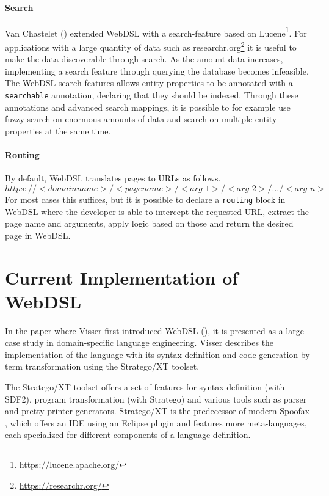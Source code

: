     \paragraph{Search} Van Chastelet (\citeyear{VanChastelet2013}) extended WebDSL with a search-feature based on Lucene\footnote{\url{https://lucene.apache.org/}}. For applications with a large quantity of data such as researchr.org\footnote{\url{https://researchr.org/}} it is useful to make the data discoverable through search. As the amount data increases, implementing a search feature through querying the database becomes infeasible. The WebDSL search features allows entity properties to be annotated with a \texttt{searchable} annotation, declaring that they should be indexed. Through these annotations and advanced search mappings, it is possible to for example use fuzzy search on enormous amounts of data and search on multiple entity properties at the same time.

    \paragraph{Routing} By default, WebDSL translates pages to URLs as follows.
    $$
    https://<domainname>/<pagename>/<arg\_1>/<arg\_2>/.../<arg\_n> 
    $$
    For most cases this suffices, but it is possible to declare a \texttt{routing} block in WebDSL where the developer is able to intercept the requested URL, extract the page name and arguments, apply logic based on those and return the desired page in WebDSL.

  \section{\label{sec:current-implementation}Current Implementation of WebDSL}

    In the paper where Visser first introduced WebDSL (\citeyear{Visser2007}), it is presented as a large case study in domain-specific language engineering. Visser describes the implementation of the language with its syntax definition and code generation by term transformation using the Stratego/XT toolset.

    The Stratego/XT toolset \autocite{BravenboerKVV08} offers a set of features for syntax definition (with SDF2), program transformation (with Stratego)  and various tools such as parser and pretty-printer generators. Stratego/XT is the predecessor of modern Spoofax \autocite{KatsV10}, which offers an IDE using an Eclipse plugin and features more meta-languages, each specialized for different components of a language definition.
    
